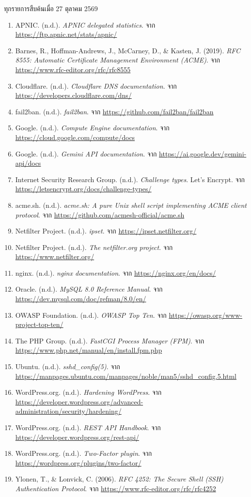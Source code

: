 
ทุกรายการสืบค้นเมื่อ 27 ตุลาคม 2569

\begin{enumerate}
\def\labelenumi{\arabic{enumi}.}
\tightlist
\item
  APNIC. (n.d.). \emph{APNIC delegated statistics}. จาก \url{https://ftp.apnic.net/stats/apnic/}
\item
  Barnes, R., Hoffman-Andrews, J., McCarney, D., \& Kasten, J. (2019). \emph{RFC 8555: Automatic Certificate Management Environment (ACME)}. จาก \url{https://www.rfc-editor.org/rfc/rfc8555}
\item
  Cloudflare. (n.d.). \emph{Cloudflare DNS documentation}. จาก \url{https://developers.cloudflare.com/dns/}
\item
  fail2ban. (n.d.). \emph{fail2ban}. จาก \url{https://github.com/fail2ban/fail2ban}
\item
  Google. (n.d.). \emph{Compute Engine documentation}. จาก \url{https://cloud.google.com/compute/docs}
\item
  Google. (n.d.). \emph{Gemini API documentation}. จาก \url{https://ai.google.dev/gemini-api/docs}
\item
  Internet Security Research Group. (n.d.). \emph{Challenge types}. Let's Encrypt. จาก \url{https://letsencrypt.org/docs/challenge-types/}
\item
  acme.sh. (n.d.). \emph{acme.sh: A pure Unix shell script implementing ACME client protocol}. จาก \url{https://github.com/acmesh-official/acme.sh}
\item
  Netfilter Project. (n.d.). \emph{ipset}. จาก \url{https://ipset.netfilter.org/}
\item
  Netfilter Project. (n.d.). \emph{The netfilter.org project}. จาก \url{https://www.netfilter.org/}
\item
  nginx. (n.d.). \emph{nginx documentation}. จาก \url{https://nginx.org/en/docs/}
\item
  Oracle. (n.d.). \emph{MySQL 8.0 Reference Manual}. จาก \url{https://dev.mysql.com/doc/refman/8.0/en/}
\item
  OWASP Foundation. (n.d.). \emph{OWASP Top Ten}. จาก \url{https://owasp.org/www-project-top-ten/}
\item
  The PHP Group. (n.d.). \emph{FastCGI Process Manager (FPM)}. จาก \url{https://www.php.net/manual/en/install.fpm.php}
\item
  Ubuntu. (n.d.). \emph{sshd\_config(5)}. จาก \url{https://manpages.ubuntu.com/manpages/noble/man5/sshd_config.5.html}
\item
  WordPress.org. (n.d.). \emph{Hardening WordPress}. จาก \url{https://developer.wordpress.org/advanced-administration/security/hardening/}
\item
  WordPress.org. (n.d.). \emph{REST API Handbook}. จาก \url{https://developer.wordpress.org/rest-api/}
\item
  WordPress.org. (n.d.). \emph{Two-Factor plugin}. จาก \url{https://wordpress.org/plugins/two-factor/}
\item
  Ylonen, T., \& Lonvick, C. (2006). \emph{RFC 4252: The Secure Shell (SSH) Authentication Protocol}. จาก \url{https://www.rfc-editor.org/rfc/rfc4252}
\end{enumerate}
